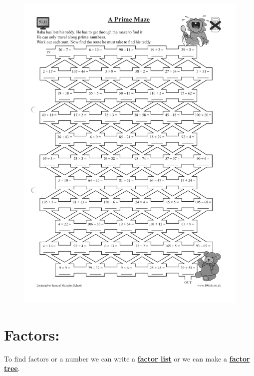 \documentclass[a4paper,12pt]{article}
\begin{document}
\newpage
\begin{figure}[!h]
	\centering
	\includegraphics[width=17cm]{Prime_Maze_TT}
\end{figure}
\newpage
\section{Factors:}
To find factors or a number we can write a \textbf{\underline{factor list}} or we can make a \textbf{\underline{factor tree}}.
\end{document}
